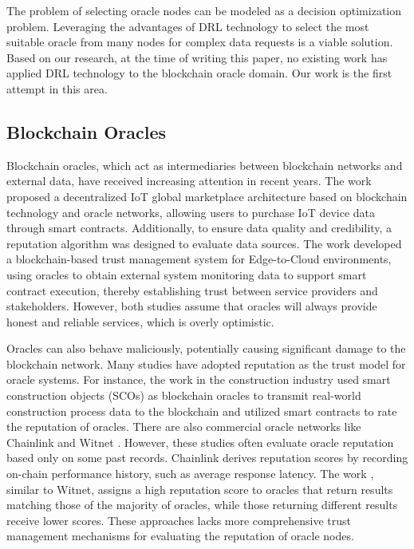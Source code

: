 The problem of selecting oracle nodes can be modeled as a decision optimization problem. Leveraging the advantages of DRL technology to select the most suitable oracle from many nodes for complex data requests is a viable solution. Based on our research, at the time of writing this paper, no existing work has applied DRL technology to the blockchain oracle domain. Our work is the first attempt in this area.
\subsection{Blockchain Oracles}
Blockchain oracles, which act as intermediaries between blockchain networks and external data, have received increasing attention in recent years. The work \cite{gigli2023decentralized} proposed a decentralized IoT global marketplace architecture based on blockchain technology and oracle networks, allowing users to purchase IoT device data through smart contracts. Additionally, to ensure data quality and credibility, a reputation algorithm was designed to evaluate data sources. The work \cite{kochovski2019trust} developed a blockchain-based trust management system for Edge-to-Cloud environments, using oracles to obtain external system monitoring data to support smart contract execution, thereby establishing trust between service providers and stakeholders. However, both studies assume that oracles will always provide honest and reliable services, which is overly optimistic.

Oracles can also behave maliciously, potentially causing significant damage to the blockchain network. Many studies have adopted reputation as the trust model for oracle systems. For instance, the work \cite{lu2021exploring} in the construction industry used smart construction objects (SCOs) as blockchain oracles to transmit real-world construction process data to the blockchain and utilized smart contracts to rate the reputation of oracles. There are also commercial oracle networks like Chainlink \cite{breidenbach2021chainlink} and Witnet \cite{de2017witnet}. However, these studies often evaluate oracle reputation based only on some past records. Chainlink derives reputation scores by recording on-chain performance history, such as average response latency. The work \cite{lu2021exploring}, similar to Witnet, assigns a high reputation score to oracles that return results matching those of the majority of oracles, while those returning different results receive lower scores. These approaches lacks more comprehensive trust management mechanisms for evaluating the reputation of oracle nodes.

